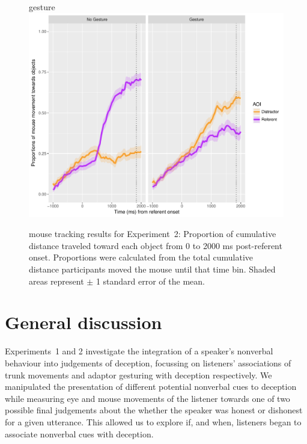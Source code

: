 \documentclass[a4paper,man,natbib]{apa6}
\begin{document}
\begin{figure}[Ht]gesture
  \centering
	\includegraphics[width=\linewidth]{./img/e8_mouset.pdf}
  \caption{mouse tracking results for Experiment~2: Proportion of cumulative distance traveled toward each object from 0 to 2000 ms post-referent onset. Proportions were calculated from the total cumulative distance participants moved the mouse until that time bin. Shaded areas represent $\pm$ 1 standard error of the mean.}
  \label{fig:v2_mouse}
\end{figure}

\section{General discussion}

Experiments~1 and 2 investigate the integration of a speaker's nonverbal behaviour into judgements of deception, focussing on listeners' associations of trunk movements and adaptor gesturing with deception respectively.
We manipulated the presentation of different potential nonverbal cues to deception while measuring eye and mouse movements of the listener towards one of two possible final judgements about the whether the speaker was honest or dishonest for a given utterance.
This allowed us to explore if, and when, listeners began to associate nonverbal cues with deception.
\end{document}
